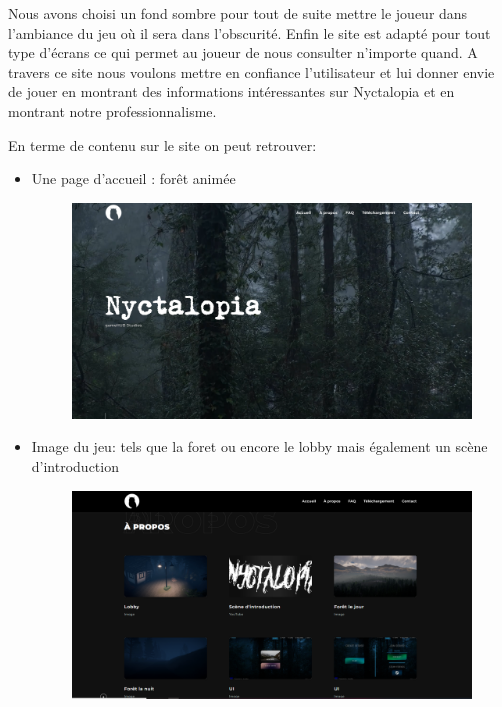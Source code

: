 Nous avons choisi un fond sombre pour tout de suite mettre le joueur dans l'ambiance du jeu où il sera dans l'obscurité. Enfin le site est adapté pour tout type d'écrans ce qui permet au joueur de nous consulter n'importe quand. A travers ce site nous voulons mettre en confiance l'utilisateur et lui donner envie de jouer en montrant des informations intéressantes sur Nyctalopia et en montrant notre professionnalisme.

\noindent En terme de contenu sur le site on peut retrouver:
\begin{itemize}
    \item Une page d'accueil : forêt animée
    
\begin{figure}[H]
\centering
\begin{minipage}{.5\textwidth}
  \centering
  \centerline{\includegraphics[width=1\linewidth]{img/acceuil.PNG}}
  \label{fig:accueil}
\end{minipage}%
\end{figure}    
    
    \item Image du jeu: tels que la foret ou encore le lobby mais également un scène  d'introduction
    
\begin{figure}[H]
\centering
\begin{minipage}{.5\textwidth}
  \centering
  \centerline{\includegraphics[width=1\linewidth]{img/propos.PNG}}
  \label{fig:imggame}
\end{minipage}%
\end{figure}

\end{itemize}

